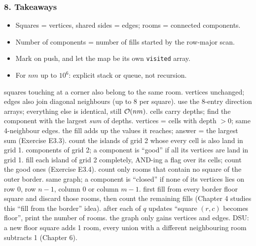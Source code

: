 \subsubsection*{8. Takeaways}

\begin{itemize}[leftmargin=*]
    \item Squares = vertices, shared sides = edges; rooms = connected components.
    \item Number of components = number of fills started by the row-major scan.
    \item Mark on push, and let the map be its own \texttt{visited} array.
    \item For $nm$ up to $10^6$: explicit stack or queue, not recursion.
\end{itemize}

\begin{variantsbox}
  {squares touching at a corner also belong to the same room.}
  {vertices unchanged; edges also join diagonal neighbours (up to 8 per square).}
  {use the 8-entry direction arrays; everything else is identical, still $\mathcal{O}(nm)$.}
  {cells carry depths; find the component with the largest \emph{sum} of depths.}
  {vertices = cells with depth $> 0$; same 4-neighbour edges.}
  {the fill adds up the values it reaches; answer = the largest sum (Exercise E3.3).}
  {count the islands of grid 2 whose every cell is also land in grid 1.}
  {components of grid 2; a component is ``good'' if all its vertices are land in grid 1.}
  {fill each island of grid 2 completely, AND-ing a flag over its cells; count the good ones (Exercise E3.4).}
  {count only rooms that contain no square of the outer border.}
  {same graph; a component is ``closed'' if none of its vertices lies on row $0$, row $n{-}1$, column $0$ or column $m{-}1$.}
  {first fill from every border floor square and discard those rooms, then count the remaining fills (Chapter 4 studies this ``fill from the border'' idea).}
  {after each of $q$ updates ``square $(r,c)$ becomes floor'', print the number of rooms.}
  {the graph only gains vertices and edges.}
  {DSU: a new floor square adds 1 room, every union with a different neighbouring room subtracts 1 (Chapter 6).}
\end{variantsbox}

